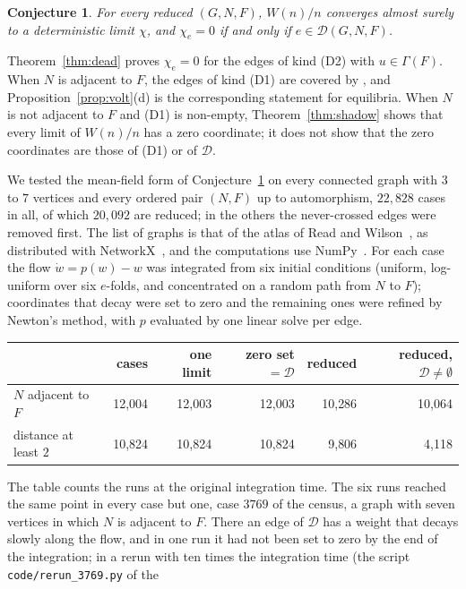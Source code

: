 \documentclass[11pt]{amsart}
\newtheorem{conjecture}[theorem]{Conjecture}
\theoremstyle{remark}
\begin{document}
\begin{conjecture}\label{conj:new}
For every reduced $(G,N,F)$, $W(n)/n$ converges almost surely to a deterministic limit $\chi$, and $\chi_e=0$ if and
only if $e\in\mathcal D(G,N,F)$.
\end{conjecture}

Theorem~\ref{thm:dead} proves $\chi_e=0$ for the edges of kind (D2) with $u\in \Gamma(F)$. When $N$ is adjacent to $F$,
the edges of kind (D1) are covered by \cite[Proposition 2.8]{KMS}, and Proposition~\ref{prop:volt}(d) is the
corresponding statement for equilibria. When $N$ is not adjacent to $F$ and (D1) is non-empty,
Theorem~\ref{thm:shadow} shows that every limit of $W(n)/n$ has a zero coordinate; it does not show that the zero
coordinates are those of (D1) or of $\mathcal D$.

We tested the mean-field form of Conjecture~\ref{conj:new} on every connected graph with $3$ to $7$ vertices and
every ordered pair $(N,F)$ up to automorphism, $22{,}828$ cases in all, of which $20{,}092$ are reduced; in the others the
never-crossed edges were removed first. The list of graphs is that of the atlas of Read and Wilson~\cite{Atlas}, as
distributed with NetworkX~\cite{NetworkX}, and the computations use NumPy~\cite{NumPy}. For each case the flow $\dot w=p(w)-w$ was integrated from six initial
conditions (uniform, log-uniform over six $e$-folds, and concentrated on a random path from $N$ to $F$); coordinates
that decay were set to zero and the remaining ones were refined by Newton's method, with $p$ evaluated by one linear
solve per edge.
\begin{center}
\begin{tabular}{lrrrrr}
\toprule
 & cases & one limit & zero set $=\mathcal D$ & reduced & reduced, $\mathcal D\neq\emptyset$\\
\midrule
$N$ adjacent to $F$ & 12{,}004 & 12{,}003 & 12{,}003 & 10{,}286 & 10{,}064\\
distance at least $2$ & 10{,}824 & 10{,}824 & 10{,}824 & 9{,}806 & 4{,}118\\
\bottomrule
\end{tabular}
\end{center}
The table counts the runs at the original integration time. The six runs reached the same point in every case but
one, case $3769$ of the census, a graph with seven vertices in which $N$ is adjacent to $F$. There an edge of
$\mathcal D$ has a weight that decays slowly along the flow, and in one run it had not been set to zero by the end of
the integration; in a rerun with ten times the integration time (the script \texttt{code/rerun\_3769.py} of the
\end{document}
